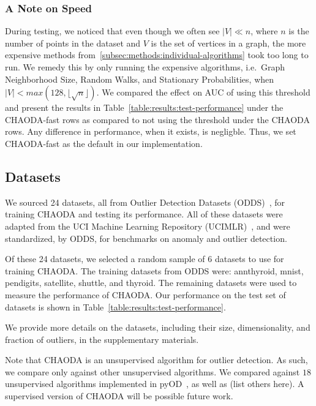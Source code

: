 \subsubsection{A Note on Speed}

During testing, we noticed that even though we often see $|V| \ll n $, where $n$ is the number of points in the dataset and $V$ is the set of vertices in a graph, the more expensive methods from~\ref{subsec:methods:individual-algorithms} took too long to run.
We remedy this by only running the expensive algorithms, i.e.\ Graph Neighborhood Size, Random Walks, and Stationary Probabilities, when $|V| < max(128, \lfloor \sqrt n \rfloor)$.
We compared the effect on AUC of using this threshold and present the results in Table~\ref{table:results:test-performance} under the CHAODA-fast rows as compared to not using the threshold under the CHAODA rows.
Any difference in performance, when it exists, is negligble.
Thus, we set CHAODA-fast as the default in our implementation.


\subsection{Datasets}
\label{subsec:methods:datasets}

We sourced 24 datasets, all from Outlier Detection Datasets (ODDS)~\cite{rayana2016odds}, for training CHAODA and testing its performance.
All of these datasets were adapted from the UCI Machine Learning Repository (UCIMLR)~\cite{UCIMLR}, and were standardized, by ODDS, for benchmarks on anomaly and outlier detection.


Of these 24 datasets, we selected a random sample of 6 datasets to use for training CHAODA\@.
The training datasets from ODDS were: annthyroid, mnist, pendigits, satellite, shuttle, and thyroid.
The remaining datasets were used to measure the performance of CHAODA\@.
Our performance on the test set of datasets is shown in Table~\ref{table:results:test-performance}.

We provide more details on the datasets, including their size, dimensionality, and fraction of outliers, in the supplementary materials.

Note that CHAODA is an unsupervised algorithm for outlier detection.
As such, we compare only against other unsupervised algorithms.
We compared against $18$ unsupervised algorithms implemented in pyOD~\cite{zhao2019pyod}, as well as (list others here). %
A supervised version of CHAODA will be possible future work.
